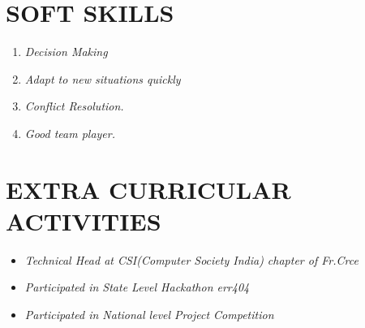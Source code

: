 \documentclass[margin]{res}
\begin{document}
\begin{resume}
\section{SOFT SKILLS }\begin{enumerate}
\item{\sl Decision Making}
\item{\sl Adapt to new situations quickly}
\item{\sl Conflict Resolution.}
\item{\sl Good team player.}
\end{enumerate}

\section{EXTRA CURRICULAR ACTIVITIES}\begin{itemize}
\item{\sl Technical Head at CSI(Computer Society India) chapter of Fr.Crce}
\item{\sl Participated in State Level Hackathon err404}
\item{\sl Participated in National level Project Competition}
\end{itemize}


\end{resume}
\end{document}
